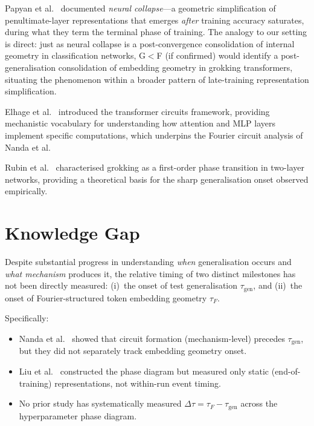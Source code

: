 \documentclass[12pt,openany,a4paper]{book}
\newcommand{\taug}{\tau_{\mathrm{gen}}}
\newcommand{\tauf}{\tau_{F}}
\newcommand{\Dtau}{\Delta\tau}
\begin{document}
Papyan et al.\ \cite{papyan2020prevalence} documented \emph{neural
collapse}---a geometric simplification of penultimate-layer
representations that emerges \emph{after} training accuracy saturates,
during what they term the terminal phase of training.
The analogy to our setting is direct: just as neural collapse is a
post-convergence consolidation of internal geometry in classification
networks, G$<$F (if confirmed) would identify a post-generalisation
consolidation of embedding geometry in grokking transformers,
situating the phenomenon within a broader pattern of late-training
representation simplification.

Elhage et al.\ \cite{elhage2021mathematical} introduced the
transformer circuits framework, providing mechanistic vocabulary
for understanding how attention and MLP layers implement specific
computations, which underpins the Fourier circuit analysis of
Nanda et al.

Rubin et al.\ \cite{rubin2024grokking} characterised grokking as
a first-order phase transition in two-layer networks, providing a
theoretical basis for the sharp generalisation onset observed
empirically.

\section{Knowledge Gap}

Despite substantial progress in understanding \emph{when} generalisation
occurs and \emph{what mechanism} produces it, the relative timing of
two distinct milestones has not been directly measured:
(i)~the onset of test generalisation $\taug$, and
(ii)~the onset of Fourier-structured token embedding geometry $\tauf$.

Specifically:
\begin{itemize}
  \item Nanda et al.\ \cite{nanda2023progress} showed that circuit
    formation (mechanism-level) precedes $\taug$, but they did not
    separately track embedding geometry onset.
  \item Liu et al.\ \cite{liu2022towards} constructed the phase diagram
    but measured only static (end-of-training) representations, not
    within-run event timing.
  \item No prior study has systematically measured $\Dtau = \tauf - \taug$
    across the hyperparameter phase diagram.
\end{itemize}
\end{document}
